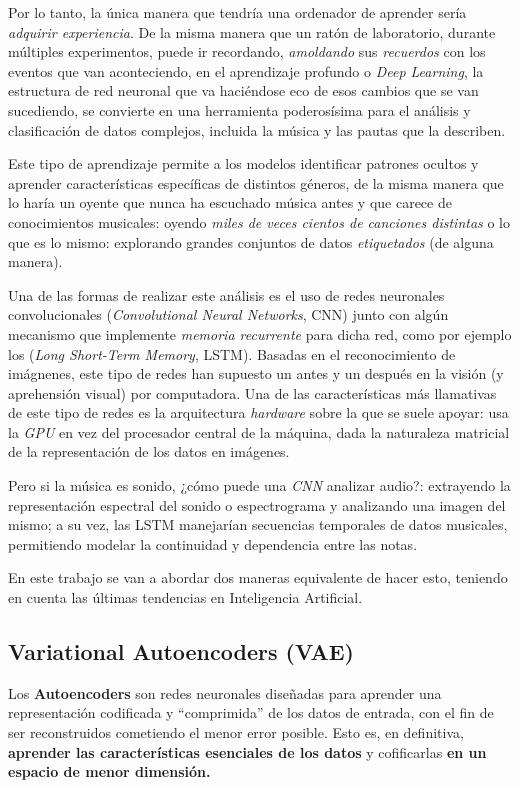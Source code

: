Por lo tanto, la única manera que tendría una ordenador de aprender sería \emph{adquirir experiencia}. De la misma manera que un ratón de laboratorio, durante múltiples experimentos, puede ir recordando, \emph{amoldando} sus \emph{recuerdos} con los eventos que van aconteciendo, en el aprendizaje profundo o \emph{Deep Learning}, la estructura de red neuronal que va haciéndose eco de esos cambios que se van sucediendo, se convierte en una herramienta poderosísima para el análisis y clasificación de datos complejos, incluida la música y las pautas que la describen. 

Este tipo de aprendizaje permite a los modelos identificar patrones ocultos y aprender características específicas de distintos géneros, de la misma manera que lo haría un oyente que nunca ha escuchado música antes y que carece de conocimientos musicales: oyendo \emph{miles de veces cientos de canciones distintas} o lo que es lo mismo: explorando grandes conjuntos de datos \emph{etiquetados} (de alguna manera).

Una de las formas de realizar este análisis es el uso de redes neuronales convolucionales (\emph{Convolutional Neural Networks}, CNN) junto con algún mecanismo que implemente \emph{memoria recurrente} para dicha red, como por ejemplo los (\emph{Long Short-Term Memory}, LSTM). Basadas en el reconocimiento de imágnenes, este tipo de redes han supuesto un antes y un después en la visión (y aprehensión visual) por computadora. Una de las características más llamativas de este tipo de redes es la arquitectura \emph{hardware} sobre la que se suele apoyar: usa la \emph{GPU} en vez del procesador central de la máquina, dada la naturaleza matricial de la representación de los datos en imágenes.

Pero si la música es sonido, ¿cómo puede una \emph{CNN} analizar audio?: extrayendo la representación espectral del sonido o espectrograma y analizando una imagen del mismo; a su vez, las LSTM manejarían secuencias temporales de datos musicales, permitiendo modelar la continuidad y dependencia entre las notas.

En este trabajo se van a abordar dos maneras equivalente de hacer esto, teniendo en cuenta las últimas tendencias en Inteligencia Artificial.

\subsection{Variational Autoencoders (VAE)}

Los \textbf{Autoencoders} son redes neuronales diseñadas para aprender una representación codificada y ``comprimida'' de los datos de entrada, con el fin de ser reconstruidos cometiendo el menor error posible. Esto es, en definitiva, \textbf{aprender las características esenciales de los datos} y cofificarlas \textbf{en un espacio de menor dimensión.}

